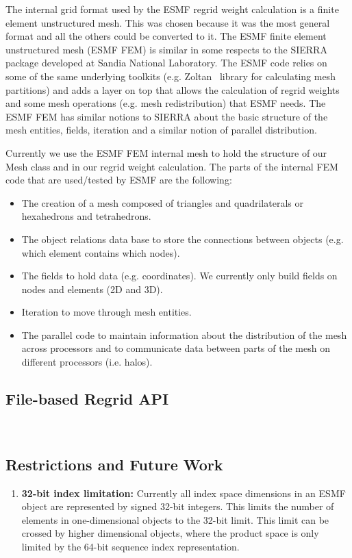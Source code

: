 The internal grid format used by the ESMF regrid weight calculation is a finite element
unstructured mesh. This was chosen because it was the most general format and all the others could be 
converted to it. The ESMF finite element unstructured mesh (ESMF FEM) is similar in some respects to the SIERRA~\cite{Sierra} package 
developed at Sandia National Laboratory. The ESMF code relies on some of the same underlying toolkits (e.g. Zoltan~\cite{Zoltan} library 
for calculating mesh partitions) and adds a layer on top that allows the calculation of regrid weights and some mesh operations 
(e.g. mesh redistribution) that ESMF needs. The ESMF FEM has similar notions to SIERRA about the basic structure of the
mesh entities, fields, iteration and a similar notion of parallel distribution. 

Currently we use the ESMF FEM internal mesh to hold the structure of our Mesh class and 
in our regrid weight calculation. The parts of the internal FEM code that are used/tested by ESMF are the following:
\begin{itemize}
\item The creation of a mesh composed of triangles and quadrilaterals or hexahedrons and tetrahedrons.
\item The object relations data base to store the connections between objects (e.g. which element contains which nodes).
\item The fields to hold data (e.g. coordinates). We currently only build fields on nodes and elements (2D and 3D).
\item Iteration to move through mesh entities.
\item The parallel code to maintain information about the distribution of the mesh across processors and to communicate data between parts of the mesh on different processors (i.e. halos).
\end{itemize}



\subsection{File-based Regrid API}~\label{sec:filebasedregrid}



\subsection{Restrictions and Future Work}
\begin{enumerate}

\item {\bf 32-bit index limitation:} Currently all index space dimensions in an ESMF object are represented by signed 32-bit integers. This limits the number of elements in one-dimensional objects to the 32-bit limit. This limit can be crossed by higher dimensional objects, where the product space is only limited by the 64-bit sequence index representation.
\end{enumerate}
